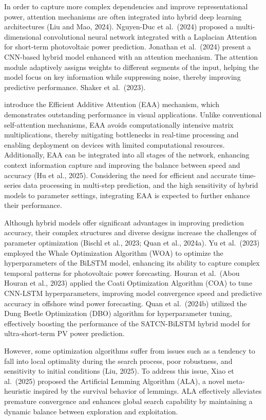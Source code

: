 \documentclass[
  10
]{article}
\begin{document}
In order to capture more complex dependencies and improve
representational power, attention mechanisms are often integrated into
hybrid deep learning architectures (Liu and Mao, 2024). Nguyen-Duc et
al.~(2024) proposed a multi-dimensional convolutional neural network
integrated with a Laplacian Attention for short-term photovoltaic power
prediction. Jonathan et al.~(2024) present a CNN-based hybrid model
enhanced with an attention mechanism. The attention module adaptively
assigns weights to different segments of the input, helping the model
focus on key information while suppressing noise, thereby improving
predictive performance. Shaker et al.~(2023).

introduce the Efficient Additive Attention (EAA) mechanism, which
demonstrates outstanding performance in visual applications. Unlike
conventional self-attention mechanisms, EAA avoids computationally
intensive matrix multiplications, thereby mitigating bottlenecks in
real-time processing and enabling deployment on devices with limited
computational resources. Additionally, EAA can be integrated into all
stages of the network, enhancing context information capture and
improving the balance between speed and accuracy (Hu et al., 2025).
Considering the need for efficient and accurate time-series data
processing in multi-step prediction, and the high sensitivity of hybrid
models to parameter settings, integrating EAA is expected to further
enhance their performance.

Although hybrid models offer significant advantages in improving
prediction accuracy, their complex structures and diverse designs
increase the challenges of parameter optimization (Bischl et al., 2023;
Quan et al., 2024a). Yu et al.~(2023) employed the Whale Optimization
Algorithm (WOA) to optimize the hyperparameters of the BiLSTM model,
enhancing its ability to capture complex temporal patterns for
photovoltaic power forecasting. Houran et al.~(Abou Houran et al., 2023)
applied the Coati Optimization Algorithm (COA) to tune CNN-LSTM
hyperparameters, improving model convergence speed and predictive
accuracy in offshore wind power forecasting. Quan et al.~(2024b)
utilized the Dung Beetle Optimization (DBO) algorithm for hyperparameter
tuning, effectively boosting the performance of the SATCN-BiLSTM hybrid
model for ultra-short-term PV power prediction.

However, some optimization algorithms suffer from issues such as a
tendency to fall into local optimality during the search process, poor
robustness, and sensitivity to initial conditions (Liu, 2025). To
address this issue, Xiao et al.~(2025) proposed the Artificial Lemming
Algorithm (ALA), a novel meta-heuristic inspired by the survival
behavior of lemmings. ALA effectively alleviates premature convergence
and enhances global search capability by maintaining a dynamic balance
between exploration and exploitation.
\end{document}
